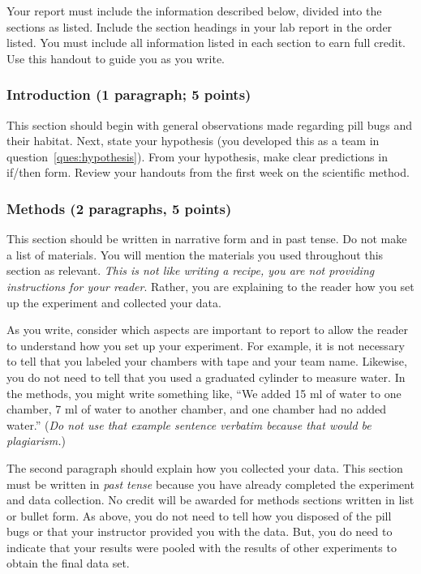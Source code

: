 \documentclass[12pt, hidelinks]{exam}
\begin{document}
Your report must include the information described below, divided into the
sections as listed. Include the section headings in your lab report in the order listed. You must 
include all information listed in each section to earn full credit. 
Use this handout to guide you as you write.

 
\subsubsection*{Introduction (1 paragraph; 5 points)} 

This section should begin with general observations made regarding
pill bugs and their habitat. Next, state your hypothesis (you developed this as a team in question~\ref{ques:hypothesis}).
From your hypothesis, make clear predictions in if/then form. Review your handouts from
the first week on the scientific method.


\subsubsection*{Methods (2 paragraphs, 5 points)} 

This section should be written in narrative form and in past tense. Do
not make a list of materials. You will mention the materials you used
throughout this section as relevant. \emph{This is not like writing a
	recipe, you are not providing instructions for your reader}. Rather, you
are explaining to the reader how you set up the experiment and collected
your data.

As you write, consider which aspects are important to report to allow
the reader to understand how you set up your experiment. For example, it
is not necessary to tell that you labeled your chambers with tape and your team name. Likewise, you do not need to tell that you used a graduated cylinder to measure water. In the methods, you might
write something like, ``We added 15 ml of water to one chamber, 7 ml of water to another chamber, and one chamber had no added water.'' (\emph{Do not use that example sentence verbatim because that would be plagiarism.})

The second paragraph should explain how you
collected your data. This section must be written in \emph{past tense} because you have
already completed the experiment and data collection. No credit will be
awarded for methods sections written in list or bullet form. As above, you do not need to tell how you disposed of the pill bugs or that your instructor provided you with the data. But, you do need to indicate that your results were pooled with the results of other experiments to obtain the final data set.
\end{document}
